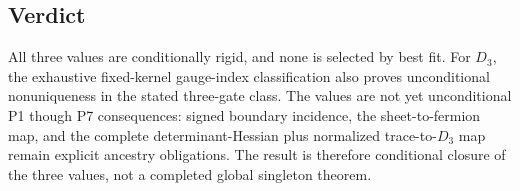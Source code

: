 \subsection{Verdict}

All three values are conditionally rigid, and none is selected by best fit.
For $D_3$, the exhaustive fixed-kernel gauge-index classification also proves
unconditional nonuniqueness in the stated three-gate class.
The values are
not yet unconditional P1 though P7 consequences: signed boundary incidence, the
sheet-to-fermion map, and the complete determinant-Hessian plus normalized
trace-to-$D_3$ map remain explicit ancestry obligations.  The result is
therefore conditional closure of the three values, not a completed global
singleton theorem.
